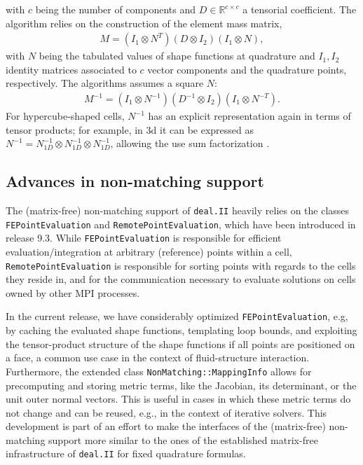 \documentclass{ansarticle-preprint}
\newcommand{\specialword}[1]{\texttt{#1}}
\newcommand{\dealii}{{\specialword{deal.II}}\xspace}
\begin{document}
\begin{itemize}
with $c$ being the number of components and $D\in \mathbb{R}^{c\times c}$ a tensorial
coefficient. The algorithm relies on the construction of the element mass matrix,
\begin{align*}
M =  ( I_1 \otimes N^T) (D \otimes I_2 ) ( I_1 \otimes N),
\end{align*}
with $N$ being the tabulated values of shape functions at quadrature and
$I_1,I_2$ identity matrices associated to $c$ vector components and the
quadrature points, respectively.
The algorithms assumes a square $N$:
\begin{align*}
M^{-1} =  ( I_1 \otimes N^{-1}) (D^{-1} \otimes I_2 ) ( I_1 \otimes N^{-T}).
\end{align*}
For hypercube-shaped cells, $N^{-1}$ has an explicit representation
again in terms of tensor products; for example, in 3d it can be
expressed as $N^{-1} = N_{1D}^{-1} \otimes N_{1D}^{-1} \otimes
N_{1D}^{-1}$, allowing the use sum factorization \cite{kronbichler2016comparison}.
\end{itemize}

\subsection{Advances in non-matching support}\label{sec:nonmatching}

The (matrix-free) non-matching support of \dealii heavily relies
on the classes \texttt{FE\-Point\-Eval\-u\-ation} and \texttt{RemotePointEvaluation},
which have been introduced in release 9.3. While \texttt{FE\-Point\-Eval\-u\-a\-tion}
is responsible for efficient evaluation/integration at arbitrary (reference)
points within a cell, \texttt{RemotePointEvaluation} is responsible for
sorting points with regards to the cells they reside in, and for the
communication necessary to evaluate solutions on cells owned by other
MPI processes.

In the current release, we have considerably optimized \texttt{FEPointEvaluation}, e.g,
by caching the evaluated shape functions, templating loop bounds, and
exploiting the tensor-product structure of the shape functions if all points are
positioned on a face, a common use case in the context of fluid-structure
interaction. Furthermore, the extended class \texttt{NonMatching::MappingInfo}
allows for precomputing and storing metric terms, like the Jacobian, its determinant,
or the unit outer normal vectors. This is useful in cases in which these metric terms do not change
and can be reused, e.g., in the context of iterative solvers. This development
is part of an effort to make the interfaces of the 
(matrix-free) non-matching support more similar to the ones of the 
established matrix-free infrastructure of \dealii for fixed quadrature formulas.
\end{document}
